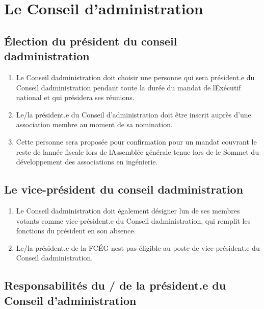 \section{Le Conseil d'administration}
\label{le-conseil-dadministration}

\subsection{Élection du président du conseil d\textquotesingle administration}
\label{election-du-president-du-conseil-d-administration}

\begin{enumerate}
 \item
  Le Conseil d\textquotesingle administration doit choisir une personne qui sera président.e du Conseil d\textquotesingle administration pendant toute la durée du mandat de l\textquotesingle Exécutif national et qui présidera ses réunions.
 \item
  Le/la président.e du Conseil d'administration doit être inscrit auprès d'une association membre au moment de sa nomination.
 \item
  Cette personne sera proposée pour confirmation pour un mandat couvrant le reste de l\textquotesingle année fiscale lors de l\textquotesingle Assemblée générale tenue lors de le Sommet du développement des associations en ingénierie.
\end{enumerate}

\subsection{Le vice-président du conseil d\textquotesingle administration}
\label{le-vice-president-du-conseil-d-administration}

\begin{enumerate}
 \item
  Le Conseil d\textquotesingle administration doit également désigner l\textquotesingle un de ses membres votants comme vice-président.e du Conseil d\textquotesingle administration, qui remplit les fonctions du président en son absence.
 \item
  Le/la président.e de la FCÉG n\textquotesingle est pas éligible au poste de vice-président.e du Conseil d\textquotesingle administration.
\end{enumerate}

\subsection{Responsabilités du / de la président.e du Conseil d'administration}
\label{responsabilites-du-de-la-president-e-du-conseil-d-administration}

